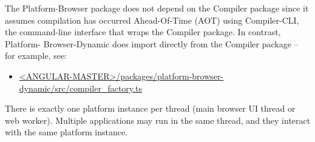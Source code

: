 The Platform-Browser package does not depend on the Compiler package since it
assumes compilation has occurred Ahead-Of-Time (AOT) using Compiler-CLI, the
command-line interface that wraps the Compiler package. In contrast, Platform-
Browser-Dynamic does import directly from the Compiler package – for example, see:

\begin{itemize}
  \item \href{https://github.com/angular/angular/tree/master/packages/platform-browser-dynamic/src/compiler_factory.ts}
        {<ANGULAR-MASTER>/packages/platform-browser-dynamic/src/compiler\_factory.ts}
\end{itemize}

There is exactly one platform instance per thread (main browser UI thread or web
worker). Multiple applications may run in the same thread, and they interact with the
same platform instance.

